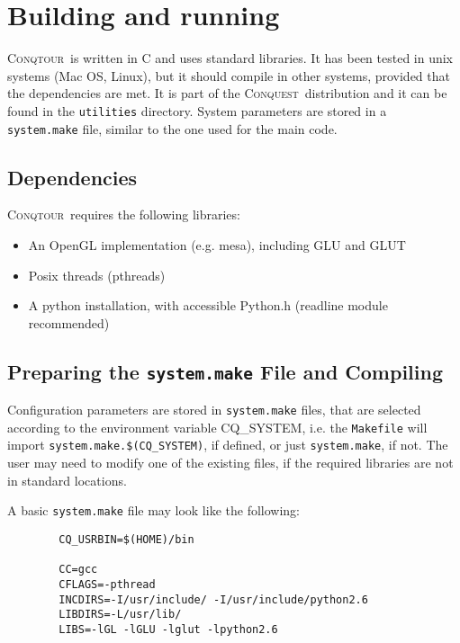 \documentclass[a4paper,notitlepage,11pt]{article}
\def\CQ{\textsc{Conquest}}
\def\Conqtour{\textsc{Conqtour}}
\begin{document}
\section{Building and running}
\label{sec:building}

\Conqtour\ is written in C and uses standard libraries. It has been tested in unix systems (Mac OS, Linux), but
it should compile in other systems, provided that the dependencies are met. It is part of the \CQ\ distribution
and it can be found in the \texttt{utilities} directory. System parameters are stored in a \texttt{system.make} file, similar 
to the one used for the main code.

\subsection{Dependencies}
\label{sec:dependencies}

\Conqtour\ requires the following libraries:

\begin{itemize}
\item An OpenGL implementation (e.g. mesa), including GLU and GLUT
\item Posix threads (pthreads)
\item A python installation, with accessible Python.h (readline module recommended)
\end{itemize}

\subsection{Preparing the \texttt{system.make} File and Compiling}
\label{sec:compiling}

Configuration parameters are stored in \texttt{system.make} files, that are selected according to
the environment variable CQ\_SYSTEM, i.e. the \texttt{Makefile} will import \texttt{system.make.\$(CQ\_SYSTEM)}, 
if defined, or just \texttt{system.make}, if not. 
The user may need to modify one of the existing files, if the required 
libraries are not in standard locations.

A basic \texttt{system.make} file may look like the following:

\begin{verbatim}
        CQ_USRBIN=$(HOME)/bin

        CC=gcc
        CFLAGS=-pthread
        INCDIRS=-I/usr/include/ -I/usr/include/python2.6
        LIBDIRS=-L/usr/lib/
        LIBS=-lGL -lGLU -lglut -lpython2.6
\end{verbatim}
\end{document}
